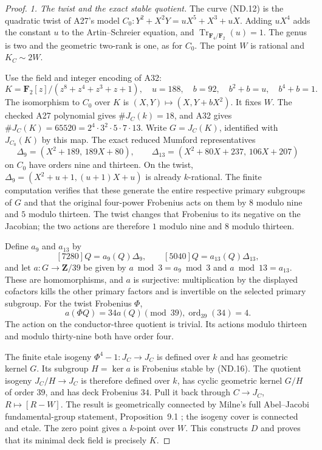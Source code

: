 \begin{proof}
\emph{1. The twist and the exact stable quotient.}
The curve (ND.12) is the quadratic twist of A27's model
$C_0:Y^2+X^2Y=uX^5+X^3+uX$. Adding $uX^4$ adds the constant
$u$ to the Artin--Schreier equation, and
$\operatorname{Tr}_{\mathbf F_4/\mathbf F_2}(u)=1$.
The genus is two and the geometric two-rank is one, as for
$C_0$. The point $W$ is rational and $K_C\sim2W$.

Use the field and integer encoding of A32:
\[
 K=\mathbf F_2[z]/(z^8+z^4+z^3+z+1),
       \quad u=188,\quad b=92,
       \quad b^2+b=u,\quad b^4+b=1.
 \tag{ND.14}
\]
The isomorphism to $C_0$ over $K$ is
$(X,Y)\mapsto(X,Y+bX^2)$. It fixes $W$.
The checked A27 polynomial gives $\#J_C(k)=18$, and A32 gives
$\#J_C(K)=65520=2^4\cdot3^2\cdot5\cdot7\cdot13$.
Write $G=J_C(K)$, identified with $J_{C_0}(K)$ by this map.
The exact reduced Mumford representatives
\[
 \Delta_9=(X^2+189,\,189X+80),\qquad
 \Delta_{13}=(X^2+80X+237,\,106X+207)
 \tag{ND.15}
\]
on $C_0$ have orders nine and thirteen. On the twist,
$\Delta_9=(X^2+u+1,(u+1)X+u)$ is already $k$-rational.
The finite computation verifies that these generate the entire
respective primary subgroups of $G$ and that the original
four-power Frobenius acts on them by $8$ modulo nine and $5$
modulo thirteen. The twist changes that Frobenius to its
negative on the Jacobian; the two actions are therefore $1$
modulo nine and $8$ modulo thirteen.

Define $a_9$ and $a_{13}$ by
\[
 [7280]Q=a_9(Q)\Delta_9,\qquad
 [5040]Q=a_{13}(Q)\Delta_{13},
\]
and let $a:G\to\mathbf Z/39$ be given by
$a\bmod3=a_9\bmod3$ and $a\bmod13=a_{13}$.
These are homomorphisms, and $a$ is surjective: multiplication
by the displayed cofactors kills the other primary factors
and is invertible on the selected primary subgroup.
For the twist Frobenius $\Phi$,
\[
                a(\Phi Q)=34a(Q)\pmod{39},
                        \operatorname{ord}_{39}(34)=4.
 \tag{ND.16}
\]
The action on the conductor-three quotient is trivial.
Its actions modulo thirteen and modulo thirty-nine both have
order four.

The finite etale isogeny $\Phi^4-1:J_C\to J_C$ is defined
over $k$ and has geometric kernel $G$.
Its subgroup $H=\ker a$ is Frobenius stable by (ND.16).
The quotient isogeny $J_C/H\to J_C$ is therefore defined
over $k$, has cyclic geometric kernel $G/H$ of order $39$,
and has deck Frobenius $34$. Pull it back through
$C\to J_C$, $R\mapsto[R-W]$. The result is geometrically
connected by Milne's full Abel--Jacobi fundamental-group
statement, Proposition~9.1 \cite{MilneJV}; the isogeny cover
is connected and etale. The zero point gives a $k$-point
over $W$. This constructs $D$ and proves that its minimal
deck field is precisely $K$.


\end{proof}
